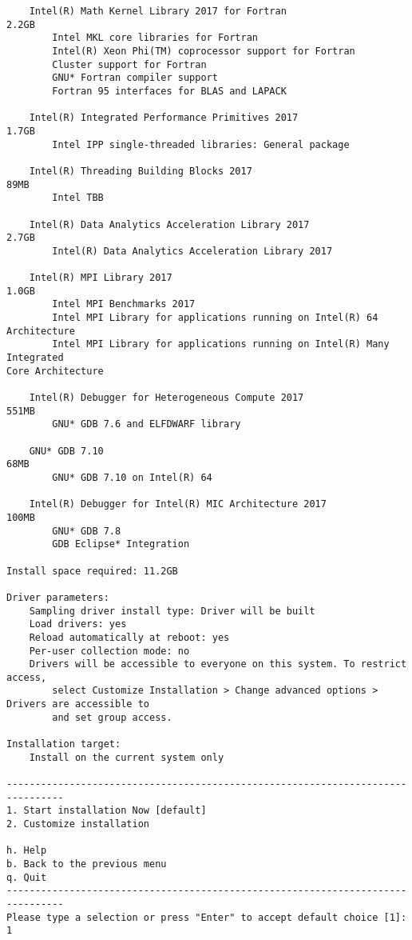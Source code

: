 \begin{lstlisting}
    Intel(R) Math Kernel Library 2017 for Fortran                          2.2GB
        Intel MKL core libraries for Fortran                                    
        Intel(R) Xeon Phi(TM) coprocessor support for Fortran                   
        Cluster support for Fortran                                             
        GNU* Fortran compiler support                                           
        Fortran 95 interfaces for BLAS and LAPACK                               

    Intel(R) Integrated Performance Primitives 2017                        1.7GB
        Intel IPP single-threaded libraries: General package                    

    Intel(R) Threading Building Blocks 2017                                 89MB
        Intel TBB                                                               

    Intel(R) Data Analytics Acceleration Library 2017                      2.7GB
        Intel(R) Data Analytics Acceleration Library 2017                       

    Intel(R) MPI Library 2017                                              1.0GB
        Intel MPI Benchmarks 2017                                               
        Intel MPI Library for applications running on Intel(R) 64 Architecture  
        Intel MPI Library for applications running on Intel(R) Many Integrated  
Core Architecture

    Intel(R) Debugger for Heterogeneous Compute 2017                       551MB
        GNU* GDB 7.6 and ELFDWARF library                                       

    GNU* GDB 7.10                                                           68MB
        GNU* GDB 7.10 on Intel(R) 64                                            

    Intel(R) Debugger for Intel(R) MIC Architecture 2017                   100MB
        GNU* GDB 7.8                                                            
        GDB Eclipse* Integration                                                

Install space required: 11.2GB

Driver parameters:
    Sampling driver install type: Driver will be built
    Load drivers: yes
    Reload automatically at reboot: yes
    Per-user collection mode: no
    Drivers will be accessible to everyone on this system. To restrict access,
        select Customize Installation > Change advanced options > Drivers are accessible to
        and set group access.

Installation target:
    Install on the current system only

--------------------------------------------------------------------------------
1. Start installation Now [default]
2. Customize installation

h. Help
b. Back to the previous menu
q. Quit
--------------------------------------------------------------------------------
Please type a selection or press "Enter" to accept default choice [1]: 1

\end{lstlisting}

